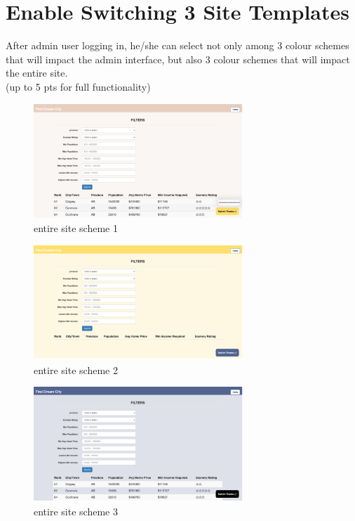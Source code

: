 \documentclass[12pt, letterpaper]{article}
\begin{document}
 \newpage

\section{Enable Switching 3 Site Templates}
After admin user logging in, he/she can select not only among 3 colour schemes that will impact the admin interface, but also 3 colour schemes that will impact the entire site. 
\\(up to 5 pts for full functionality)

\begin{figure}[htbp]
	\centering
	\includegraphics[width=3.1in]{images/q14_1.png}
	\caption{entire site scheme 1}
 \end{figure}
 
 \begin{figure}[htbp]
	\centering
	\includegraphics[width=3.1in]{images/q14_2.png}
	\caption{entire site scheme 2}
 \end{figure}

\begin{figure}[htbp]
	\centering
	\includegraphics[width=3.1in]{images/q14_3.png}
	\caption{entire site scheme 3}
 \end{figure}
 \newpage
 
\end{document}

